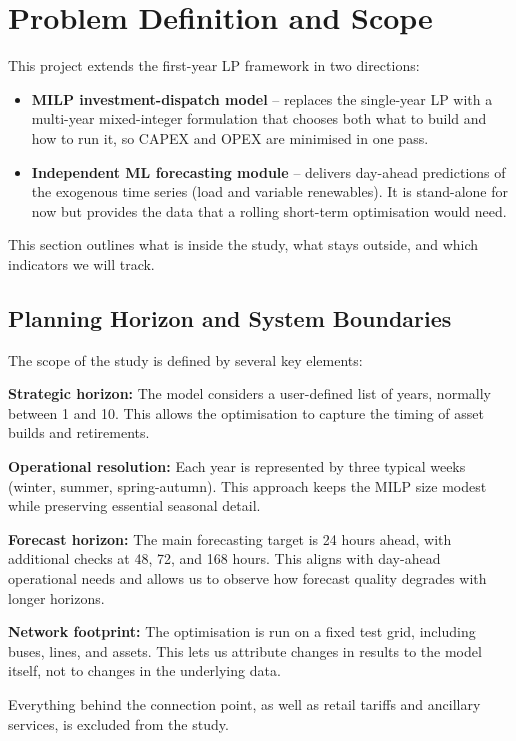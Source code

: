 \newpage
\section{Problem Definition and Scope}

This project extends the first-year LP framework in two directions:
\begin{itemize}
    \item \textbf{MILP investment-dispatch model} – replaces the single-year LP with a multi-year 
    mixed-integer formulation that chooses both what to build and how to run it, so CAPEX and 
    OPEX are minimised in one pass.
    \item \textbf{Independent ML forecasting module} – delivers day-ahead predictions of the 
    exogenous time series (load and variable renewables). It is stand-alone for now but provides 
    the data that a rolling short-term optimisation would need.
\end{itemize}

This section outlines what is inside the study, what stays outside, and which indicators we will track.

\subsection{Planning Horizon and System Boundaries}

The scope of the study is defined by several key elements:

\textbf{Strategic horizon:} The model considers a user-defined list of years, normally between 1 and 10. 
This allows the optimisation to capture the timing of asset builds and retirements.

\textbf{Operational resolution:} Each year is represented by three typical weeks (winter, summer, 
spring-autumn). This approach keeps the MILP size modest while preserving essential seasonal detail.

\textbf{Forecast horizon:} The main forecasting target is 24 hours ahead, with additional checks at 48, 72, and 168 hours. This aligns with day-ahead operational needs and allows us to observe how forecast quality degrades with longer horizons.

\textbf{Network footprint:} The optimisation is run on a fixed test grid, including buses, lines, and assets. This lets us attribute changes in results to the model itself, not to changes in the underlying data.

Everything behind the connection point, as well as retail tariffs and ancillary services, is excluded from the study.

